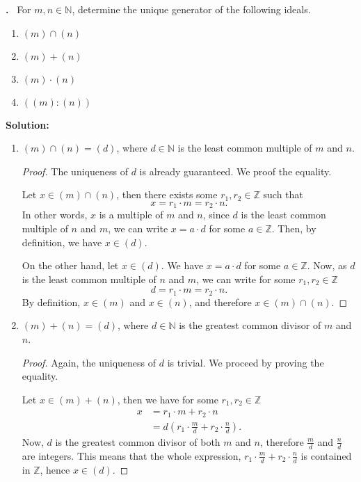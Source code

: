\documentclass[11pt]{scrartcl}
\newcounter{problem}
\newcounter{solution}
\newcommand\Problem{%
  \stepcounter{problem}%
  \textbf{\theproblem.}~%
  \setcounter{solution}{0}%
}
\newcommand\TheSolution{%
  \textbf{Solution:}\\%
}
\begin{document}
\Problem For \(m, n \in \mathbb{N}\), determine the unique generator of the following ideals.
\begin{enumerate}
    \item \( (m) \cap (n) \)
    \item \( (m) + (n) \)
    \item \( (m) \cdot (n)\)
    \item \( ((m) : (n)) \)
\end{enumerate}

\TheSolution
\begin{enumerate}
    \item \( (m) \cap (n) = (d) \), where \(d \in \mathbb{N}\) is the least common multiple of \(m\) and \(n\).
    \begin{proof}
        The uniqueness of \(d\) is already guaranteed. We proof the equality.

        Let \( x \in (m) \cap (n) \), then there exists some \(r_1, r_2 \in \mathbb{Z}\) such that
        \[x = r_1 \cdot m = r_2 \cdot n \text{.}\]
        In other words, \(x\) is a multiple of \(m\) and \(n\), since \(d\) is the least common multiple of \(n\) and \(m\), we can write \(x = a \cdot d\) for some \(a \in \mathbb{Z}\). Then, by definition, we have \( x \in (d) \).

        On the other hand, let \(x \in (d) \). We have \(x = a \cdot d\) for some \(a \in \mathbb{Z}\). Now, as \(d\) is the least common multiple of \(n\) and \(m\), we can write for some \(r_1, r_2 \in \mathbb{Z}\)
        \[d = r_1 \cdot m = r_2 \cdot n \text{.}\]
        By definition, \(x \in (m)\) and \(x \in (n)\), and therefore \(x \in (m) \cap (n)\).
    \end{proof}
    \item \((m) + (n) = (d)\), where \(d \in \mathbb{N}\) is the greatest common divisor of \(m\) and \(n\).
    \begin{proof}
        Again, the uniqueness of \(d\) is trivial. We proceed by proving the equality.

        Let \(x \in (m) + (n)\), then we have for some \( r_1, r_2 \in \mathbb{Z}\)
        \begin{align*}
            x &= r_1 \cdot m + r_2 \cdot n \\
              &= d ( r_1 \cdot \frac{m}{d} + r_2 \cdot \frac{n}{d} ) \text{.}
        \end{align*}
        Now, \(d\) is the greatest common divisor of both \(m\) and \(n\), therefore \(\frac{m}{d}\) and \(\frac{n}{d}\) are integers. This means that the whole expression, \( r_1 \cdot \frac{m}{d} + r_2 \cdot \frac{n}{d} \) is contained in \( \mathbb{Z} \), hence \(x \in (d)\).


\end{proof}
\end{enumerate}
\end{document}
